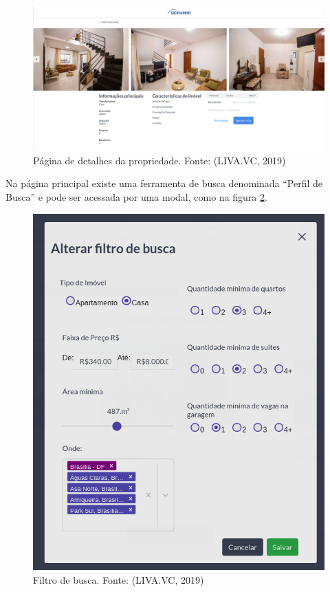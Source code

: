 \begin{figure}[H]
    \centering
    \includegraphics[scale=0.23]{figuras/proposta/pagina_detalhes.png}
    \caption[Página de detalhes da propriedade]{Página de detalhes da propriedade. Fonte: (LIVA.VC, 2019)}
    \label{fig:pagina_detalhes}
\end{figure}

Na página principal existe uma ferramenta de busca denominada “Perfil de Busca” e pode ser acessada por uma modal, como na figura \ref{fig:filtro_busca}.

\begin{figure}[H]
    \centering
    \includegraphics[scale=0.6]{figuras/proposta/filtro_busca.png}
    \caption[Filtro de busca]{Filtro de busca. Fonte: (LIVA.VC, 2019)}
    \label{fig:filtro_busca}
\end{figure}

